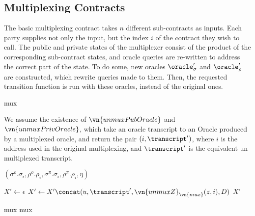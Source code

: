 \subsection{Multiplexing Contracts}

The basic multiplexing contract takes $n$ different sub-contracts as inputs.
Each party supplies not only the input, but the index $i$ of the contract they
wish to call. The public and private states of the multiplexer consist of the
product of the corresponding sub-contract states, and oracle queries are
re-written to address the correct part of the state. To do some, new oracles
$\oracle_\sigma'$ and $\oracle_\rho'$ are constructed, which rewrite queries
made to them. Then, the requested transition function is run with these oracles,
instead of the original ones.

{mux}

\sloppy
We assume the existence of $\vn{unmuxPubOracle}$ and
$\vn{unmuxPrivOracle}$, which take an oracle transcript to an Oracle produced
by a multiplexed oracle, and return the pair $(i, \transcript')$, where $i$ is
the address used in the original multiplexing, and $\transcript'$ is the
equivalent un-multiplexed transcript.

\fussy
\begin{algorithmic}
    \State \Return $(\sigma^o.\sigma_i, \rho^o.\rho_i, \sigma^\pi.\sigma_i,
      \rho^\pi.\rho_i, \eta)$
  \EndFunction
\end{algorithmic}
\begin{algorithmic}
    \State \Let $X' \gets \epsilon$
        \State \Let $X' \gets X' \concat (u, \transcript',
          \vn{unmuxZ}_{\vn{mux}}(z, i), D)$
      \EndIf
    \EndFor
    \State \Return $X'$
  \EndFunction
\end{algorithmic}
{mux}
{mux}

